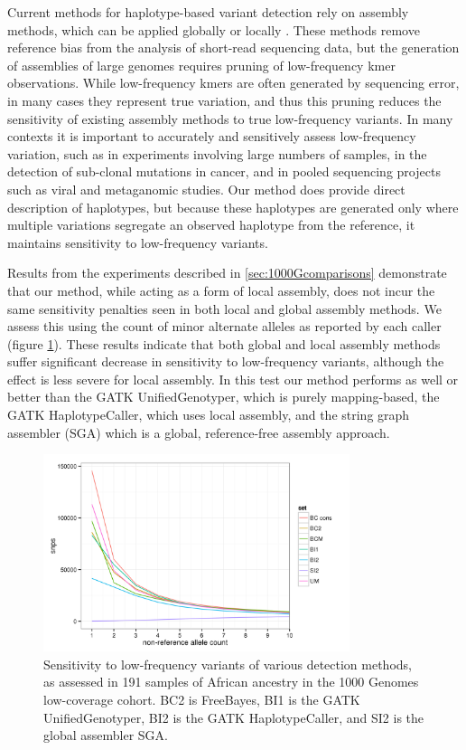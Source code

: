 \documentclass{article}
\begin{document}
Current methods for haplotype-based variant detection rely on assembly methods, which can be applied globally \citep{cortex} or locally \citep{dindel}.  These methods remove reference bias from the analysis of short-read sequencing data, but the generation of assemblies of large genomes requires pruning of low-frequency kmer observations.  While low-frequency kmers are often generated by sequencing error, in many cases they represent true variation, and thus this pruning reduces the sensitivity of existing assembly methods to true low-frequency variants.  In many contexts it is important to accurately and sensitively assess low-frequency variation, such as in experiments involving large numbers of samples, in the detection of sub-clonal mutations in cancer, and in pooled sequencing projects such as viral and metaganomic studies.  Our method does provide direct description of haplotypes, but because these haplotypes are generated only where multiple variations segregate an observed haplotype from the reference, it maintains sensitivity to low-frequency variants.

Results from the experiments described in \ref{sec:1000Gcomparisons} demonstrate that our method, while acting as a form of local assembly, does not incur the same sensitivity penalties seen in both local and global assembly methods.  We assess this using the count of minor alternate alleles as reported by each caller (figure \ref{fig:lowfreqsens}).  These results indicate that both global and local assembly methods suffer significant decrease in sensitivity to low-frequency variants, although the effect is less severe for local assembly.  In this test our method performs as well or better than the GATK UnifiedGenotyper, which is purely mapping-based, the GATK HaplotypeCaller, which uses local assembly, and the string graph assembler (SGA) which is a global, reference-free assembly approach.

\begin{figure}[h!]
\centering
\includegraphics[width=0.8\textwidth]{low_frequency_sensitivity}
\caption{Sensitivity to low-frequency variants of various detection methods, as assessed in 191 samples of African ancestry in the 1000 Genomes low-coverage cohort.   BC2 is FreeBayes, BI1 is the GATK UnifiedGenotyper, BI2 is the GATK HaplotypeCaller, and SI2 is the global assembler SGA.}
\label{fig:lowfreqsens}
\end{figure}
\end{document}
